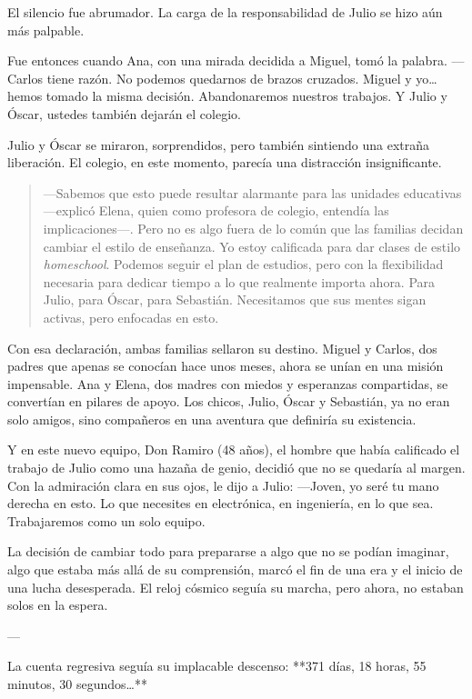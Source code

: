 \documentclass[a4paper,12pt]{book}
\begin{document}
El silencio fue abrumador. La carga de la responsabilidad de Julio se hizo aún más palpable.

Fue entonces cuando Ana, con una mirada decidida a Miguel, tomó la palabra. —Carlos tiene razón. No podemos quedarnos de brazos cruzados. Miguel y yo… hemos tomado la misma decisión. Abandonaremos nuestros trabajos. Y Julio y Óscar, ustedes también dejarán el colegio.

Julio y Óscar se miraron, sorprendidos, pero también sintiendo una extraña liberación. El colegio, en este momento, parecía una distracción insignificante.

\begin{quote}
    —Sabemos que esto puede resultar alarmante para las unidades educativas —explicó Elena, quien como profesora de colegio, entendía las implicaciones—. Pero no es algo fuera de lo común que las familias decidan cambiar el estilo de enseñanza. Yo estoy calificada para dar clases de estilo \textit{homeschool}. Podemos seguir el plan de estudios, pero con la flexibilidad necesaria para dedicar tiempo a lo que realmente importa ahora. Para Julio, para Óscar, para Sebastián. Necesitamos que sus mentes sigan activas, pero enfocadas en esto.
\end{quote}

Con esa declaración, ambas familias sellaron su destino. Miguel y Carlos, dos padres que apenas se conocían hace unos meses, ahora se unían en una misión impensable. Ana y Elena, dos madres con miedos y esperanzas compartidas, se convertían en pilares de apoyo. Los chicos, Julio, Óscar y Sebastián, ya no eran solo amigos, sino compañeros en una aventura que definiría su existencia.

Y en este nuevo equipo, Don Ramiro (48 años), el hombre que había calificado el trabajo de Julio como una hazaña de genio, decidió que no se quedaría al margen. Con la admiración clara en sus ojos, le dijo a Julio: —Joven, yo seré tu mano derecha en esto. Lo que necesites en electrónica, en ingeniería, en lo que sea. Trabajaremos como un solo equipo.

La decisión de cambiar todo para prepararse a algo que no se podían imaginar, algo que estaba más allá de su comprensión, marcó el fin de una era y el inicio de una lucha desesperada. El reloj cósmico seguía su marcha, pero ahora, no estaban solos en la espera.

---

La cuenta regresiva seguía su implacable descenso: **371 días, 18 horas, 55 minutos, 30 segundos…**
\end{document}
